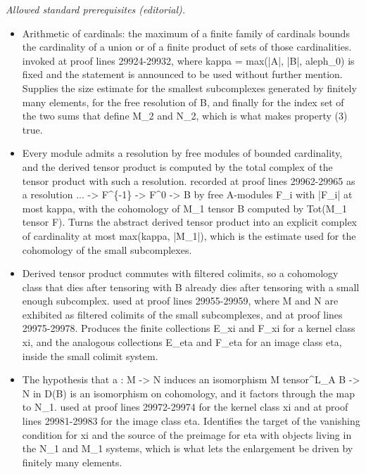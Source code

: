 \documentclass[10pt,a4paper]{amsart}
\theoremstyle{plain}
\theoremstyle{definition}
\theoremstyle{remark}
\numberwithin{equation}{subsection}
\begin{document}
\noindent\textit{Allowed standard prerequisites (editorial).}\begin{itemize}
\item Arithmetic of cardinals: the maximum of a finite family of cardinals bounds the cardinality of a union or of a finite product of sets of those cardinalities. invoked at proof lines 29924-29932, where kappa = max(|A|, |B|, aleph\_0) is fixed and the statement is announced to be used without further mention. Supplies the size estimate for the smallest subcomplexes generated by finitely many elements, for the free resolution of B, and finally for the index set of the two sums that define M\_2 and N\_2, which is what makes property (3) true.
\item Every module admits a resolution by free modules of bounded cardinality, and the derived tensor product is computed by the total complex of the tensor product with such a resolution. recorded at proof lines 29962-29965 as a resolution ... -> F\textasciicircum{}\{-1\} -> F\textasciicircum{}0 -> B by free A-modules F\_i with |F\_i| at most kappa, with the cohomology of M\_1 tensor B computed by Tot(M\_1 tensor F). Turns the abstract derived tensor product into an explicit complex of cardinality at most max(kappa, |M\_1|), which is the estimate used for the cohomology of the small subcomplexes.
\item Derived tensor product commutes with filtered colimits, so a cohomology class that dies after tensoring with B already dies after tensoring with a small enough subcomplex. used at proof lines 29955-29959, where M and N are exhibited as filtered colimits of the small subcomplexes, and at proof lines 29975-29978. Produces the finite collections E\_xi and F\_xi for a kernel class xi, and the analogous collections E\_eta and F\_eta for an image class eta, inside the small colimit system.
\item The hypothesis that a : M -> N induces an isomorphism M tensor\textasciicircum{}L\_A B -> N in D(B) is an isomorphism on cohomology, and it factors through the map to N\_1. used at proof lines 29972-29974 for the kernel class xi and at proof lines 29981-29983 for the image class eta. Identifies the target of the vanishing condition for xi and the source of the preimage for eta with objects living in the N\_1 and M\_1 systems, which is what lets the enlargement be driven by finitely many elements.
\end{itemize}\medskip
\end{document}
